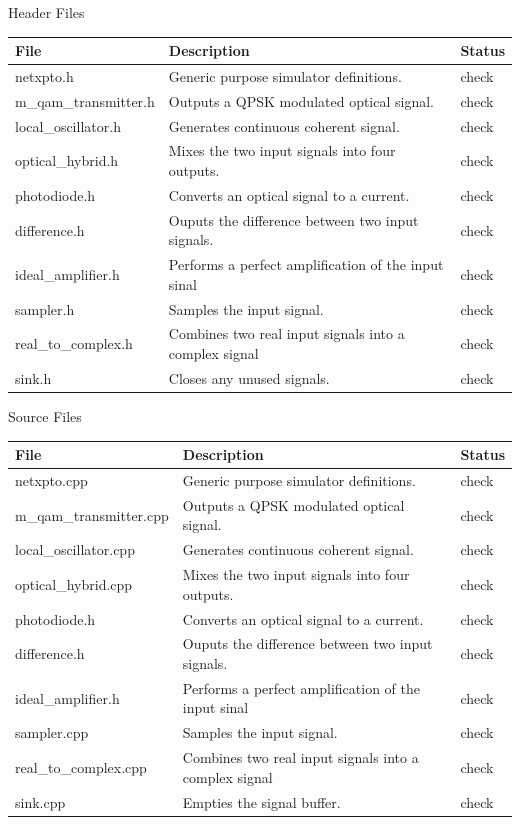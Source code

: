 \begin{bibunit}[plain]
Header Files
\begin{table}[H]
\centering
\begin{tabulary}{1.0\textwidth}{|L|L|l|}
\hline
\textbf{File}			& \textbf{Description}									& {\bf Status}\\
\hline
netxpto.h               & Generic purpose simulator definitions.				& check\\
\hline
m\_qam\_transmitter.h   & Outputs a QPSK modulated optical signal.				& check\\
\hline
local\_oscillator.h     & Generates continuous coherent signal.					& check\\
\hline
optical\_hybrid.h       & Mixes the two input signals into four outputs.		& check\\
\hline
photodiode.h            & Converts an optical signal to a current.				& check\\
\hline
difference.h            & Ouputs the difference between two input signals.		& check\\
\hline
ideal\_amplifier.h		& Performs a perfect amplification of the input sinal	& check\\
\hline
sampler.h               & Samples the input signal.								& check\\
\hline
real\_to\_complex.h		& Combines two real input signals into a complex signal	& check\\
\hline
sink.h                  & Closes any unused signals.							& check\\
\hline
\end{tabulary}
\end{table}
%
%
Source Files
\begin{table}[H]
\centering
\begin{tabulary}{1.0\textwidth}{|L|L|l|}
\hline
\textbf{File}			& \textbf{Description}									& {\bf Status}\\
\hline
netxpto.cpp				& Generic purpose simulator definitions.				& check\\
\hline
m\_qam\_transmitter.cpp	& Outputs a QPSK modulated optical signal.				& check\\
\hline
local\_oscillator.cpp	& Generates continuous coherent signal.					& check\\
\hline
optical\_hybrid.cpp		& Mixes the two input signals into four outputs.		& check\\
\hline
photodiode.h			& Converts an optical signal to a current.				& check\\
\hline
difference.h			& Ouputs the difference between two input signals.		& check\\
\hline
ideal\_amplifier.h		& Performs a perfect amplification of the input sinal	& check\\
\hline
sampler.cpp				& Samples the input signal.								& check\\
\hline
real\_to\_complex.cpp	& Combines two real input signals into a complex signal	& check\\
\hline
sink.cpp				& Empties the signal buffer.							& check\\
\hline
\end{tabulary}
\end{table}




\end{bibunit}
